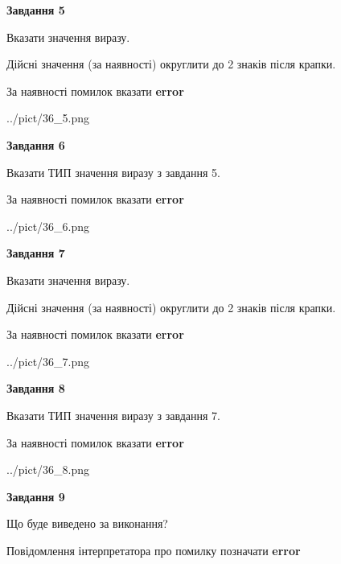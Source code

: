 \documentclass[11pt, ukrainian]{article}
\begin{document}
{\begin {large}
{\begin {center}\textbf{Завдання 5}\end {center}}\par
Вказати значення виразу. \par
Дійсні значення (за наявності) округлити до 2 знаків після крапки. \par
За наявності помилок вказати \textbf{error}

\begin{center}
	{../pict/36_5.png}
\end{center}
\newpage

{\begin {center}\textbf{Завдання 6}\end {center}}\par
Вказати ТИП значення виразу з завдання 5. \par
За наявності помилок вказати \textbf{error}

\begin{center}
	{../pict/36_6.png}
\end{center}
\newpage

{\begin {center}\textbf{Завдання 7}\end {center}}\par
Вказати значення виразу. \par
Дійсні значення (за наявності) округлити до 2 знаків після крапки. \par
За наявності помилок вказати \textbf{error}

\begin{center}
	{../pict/36_7.png}
\end{center}
\newpage

{\begin {center}\textbf{Завдання 8}\end {center}}\par
Вказати ТИП значення виразу з завдання 7. \par
За наявності помилок вказати \textbf{error}

\begin{center}
	{../pict/36_8.png}
\end{center}
\newpage

{\begin {center}\textbf{Завдання 9}\end {center}}\par
Що буде виведено за виконання? \par
Повідомлення інтерпретатора про помилку позначати \textbf{error}


\end{large}}
\end{document}
